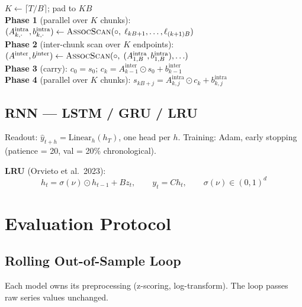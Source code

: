 \documentclass[11pt, a4paper]{article}
\begin{document}
\begin{algorithm}[H]
\caption{Two-Level Parallel Scan — compute $s_1,\ldots,s_T$}
$K \leftarrow \lceil T/B \rceil$; pad to $KB$ \\
\textbf{Phase 1} (parallel over $K$ chunks):
  $(A^\text{intra}_{k,\cdot},b^\text{intra}_{k,\cdot})
  \leftarrow \textsc{AssocScan}(\circ,\;\ell_{kB+1},\ldots,\ell_{(k+1)B})$ \\
\textbf{Phase 2} (inter-chunk scan over $K$ endpoints):
  $(A^\text{inter},b^\text{inter})
  \leftarrow \textsc{AssocScan}(\circ,\;(A^\text{intra}_{1,B},b^\text{intra}_{1,B}),\ldots)$ \\
\textbf{Phase 3} (carry):
  $c_0 = s_0$;\;
  $c_k = A^\text{inter}_{k-1} \odot s_0 + b^\text{inter}_{k-1}$ \\
\textbf{Phase 4} (parallel over $K$ chunks):
  $s_{kB+j} = A^\text{intra}_{k,j} \odot c_k + b^\text{intra}_{k,j}$
\end{algorithm}

\subsection{RNN — LSTM / GRU / LRU}

Readout: $\hat{y}_{t+h} = \text{Linear}_h(h_T)$, one head per $h$.
Training: Adam, early stopping (patience = 20, val = 20\% chronological).

\textbf{LRU} (Orvieto et al.\ 2023):
\begin{equation}
  h_t = \sigma(\nu) \odot h_{t-1} + Bz_t, \qquad y_t = Ch_t,
  \qquad \sigma(\nu) \in (0,1)^d
\end{equation}

\section{Evaluation Protocol}

\subsection{Rolling Out-of-Sample Loop}

Each model owns its preprocessing (z-scoring, log-transform).
The loop passes raw series values unchanged.
\end{document}
